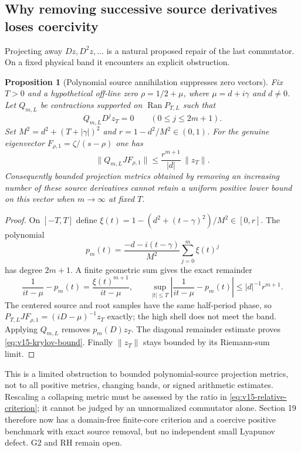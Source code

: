 \documentclass[11pt]{article}
\newtheorem{proposition}[theorem]{Proposition}
\theoremstyle{remark}
\begin{document}
\subsection*{Why removing successive source derivatives loses coercivity}
Projecting away $Dz,D^2z,\ldots$ is a natural proposed repair of the last
commutator. On a fixed physical band it encounters an explicit obstruction.

\begin{proposition}[Polynomial source annihilation suppresses zero vectors]
\label{prop:v15-krylov}
Fix $T>0$ and a hypothetical off-line zero
$\rho=1/2+\mu$, where $\mu=d+i\gamma$ and $d\ne0$.
Let $Q_{m,L}$ be contractions supported on $\operatorname{Ran}P_{T,L}$
such that
\[
 Q_{m,L}D^jz_T=0\qquad(0\le j\le2m+1).
\]
Set $M^2=d^2+(T+|\gamma|)^2$ and
$r=1-d^2/M^2\in(0,1)$. For the genuine eigenvector
$F_{\rho,1}=\zeta/(s-\rho)$ one has
\begin{equation}\label{eq:v15-krylov-bound}
 \|Q_{m,L}JF_{\rho,1}\|
 \le \frac{r^{m+1}}{|d|}\,\|z_T\|.
\end{equation}
Consequently bounded projection metrics obtained by removing an increasing
number of these source derivatives cannot retain a uniform positive lower
bound on this vector when $m\to\infty$ at fixed $T$.
\end{proposition}
\begin{proof}
On $[-T,T]$ define $\xi(t)=1-(d^2+(t-\gamma)^2)/M^2\in[0,r]$.
The polynomial
\[
 p_m(t)=\frac{-d-i(t-\gamma)}{M^2}
                   \sum_{j=0}^m\xi(t)^j
\]
has degree $2m+1$. A finite geometric sum gives the exact remainder
\[
 \frac1{it-\mu}-p_m(t)
       =\frac{\xi(t)^{m+1}}{it-\mu},\qquad
 \sup_{|t|\le T}\left|\frac1{it-\mu}-p_m(t)\right|
       \le |d|^{-1}r^{m+1}.
\]
The centered source and root samples have the same half-period phase, so
$P_{T,L}JF_{\rho,1}=(iD-\mu)^{-1}z_T$ exactly; the high shell
does not meet the band. Applying $Q_{m,L}$ removes $p_m(D)z_T$.
The diagonal remainder estimate proves \eqref{eq:v15-krylov-bound}.
Finally $\|z_T\|$ stays bounded by its Riemann-sum limit.
\end{proof}

This is a limited obstruction to bounded polynomial-source projection
metrics, not to all positive metrics, changing bands, or signed arithmetic
estimates. Rescaling a collapsing metric must be assessed by the ratio in
\eqref{eq:v15-relative-criterion}; it cannot be judged by an unnormalized
commutator alone. Section 19 therefore now has a domain-free finite-core
criterion and a coercive positive benchmark with exact source removal,
but no independent small Lyapunov defect. G2 and RH remain open.
\end{document}
